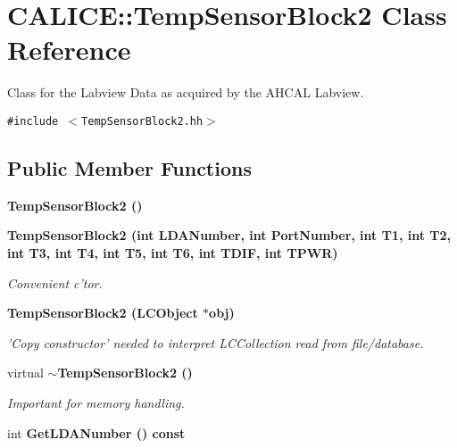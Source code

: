 \section{CALICE::Temp\-Sensor\-Block2 Class Reference}
\label{classCALICE_1_1TempSensorBlock2}
Class for the Labview Data as acquired by the AHCAL Labview.  


{\tt \#include $<$Temp\-Sensor\-Block2.hh$>$}

\subsection*{Public Member Functions}
\begin{CompactItemize}
\item 
\bf{Temp\-Sensor\-Block2} ()\label{classCALICE_1_1TempSensorBlock2_f38143a29ea3f11050f38dd0f7450916}

\item 
\bf{Temp\-Sensor\-Block2} (int LDANumber, int Port\-Number, int T1, int T2, int T3, int T4, int T5, int T6, int TDIF, int TPWR)\label{classCALICE_1_1TempSensorBlock2_1ff42e93847d9a7f14f73c5652988ba6}

\begin{CompactList}\small\item\em Convenient c'tor. \item\end{CompactList}\item 
\bf{Temp\-Sensor\-Block2} (LCObject $\ast$obj)\label{classCALICE_1_1TempSensorBlock2_2e2cd2e0cee6be53975c86a5b1e5961e}

\begin{CompactList}\small\item\em 'Copy constructor' needed to interpret LCCollection read from file/database. \item\end{CompactList}\item 
virtual \bf{$\sim$Temp\-Sensor\-Block2} ()\label{classCALICE_1_1TempSensorBlock2_949997ef4f112adca75b4c9cb1951164}

\begin{CompactList}\small\item\em Important for memory handling. \item\end{CompactList}\item 
int \bf{Get\-LDANumber} () const \label{classCALICE_1_1TempSensorBlock2_531f8320297f3ef302d07fd8ddc33ac8}


\end{CompactItemize}
